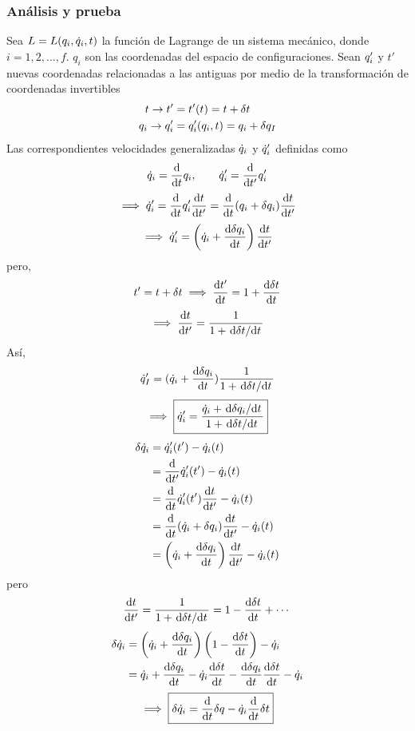 \subsubsection{Análisis y prueba}
Sea $L=L(q_i,\dot{q}_i,t)$ la función de Lagrange de un sistema mecánico, donde $i=1,2,...,f$. $q_i$ son las coordenadas del espacio de configuraciones. Sean $q'_i$ y $t'$ nuevas coordenadas relacionadas a las antiguas por medio de la transformación de coordenadas invertibles 
\begin{align}
  t\to t'&=t'(t)=t+\delta t\\
  q_i\to q' _i&=q'_i(q_i,t)=q_i+\delta q_I
\end{align}
Las correspondientes velocidades generalizadas $\dot{q}_i$ y $\dot{q}'_i$ definidas como
\begin{equation}
  \dot{q}_i=\dv{t}q_i,\qquad \dot{q}'_i=\dv{t'}q'_i
\end{equation}
\begin{equation}
	\implies  \dot{q}'_i=\dv{t}q'_i\dv{t}{t'}=\dv{t}(q_i+\delta q_i)\dv{t}{t'}
\end{equation}
\begin{equation}
  \implies \dot{q}'_i=\left(\dot{q}_i+\dv{\delta q_i}{t}\right)\dv{t}{t'}
\end{equation}
pero, 
\begin{equation}
  t'=t+\delta t\implies \dv{t'}{t}=1+\dv{\delta t}{t}
\end{equation}
\begin{equation}
  \implies \dv{t}{t'}=\frac{1}{1+\dv*{\delta t}{t}}
\end{equation}
Así,
\begin{equation}
  \dot{q}'_I=(\dot{q}_i+\dv{\delta q_i}{t})\frac{1}{1+\dv*{\delta t}{t}}
\end{equation}
\begin{equation}
  \implies \boxed{\dot{q}'_i=\frac{\dot{q}_i+\dv*{\delta q_i}{t}}{1+\dv*{\delta t}{t}}}
\end{equation}
\begin{align}
  \delta \dot{q}_i&=\dot{q}'_i(t')-\dot{q}_i(t)\\
  &=\dv{t'}\dot{q}'_i(t')-\dot{q}_i(t)\\
  &=\dv{t}\dot{q}'_i(t')\dv{t}{t'}-\dot{q}_i(t)\\
  &=\dv{t}(\dot{q}_i+\delta q_i)\dv{t}{t'}-\dot{q}_i(t)\\
  &=\left(\dot{q}_i+\dv{\delta q_i}{t}\right)\dv{t}{t'}-\dot{q}_i(t)
\end{align}
pero
\begin{equation}
  \dv{t}{t'}=\frac{1}{1+\dv*{\delta t}{t}}=1-\dv{\delta t}{t}+\cdots 
\end{equation}
\begin{align}
  \delta \dot{q}_i&=\left(\dot{q}_i+\dv{\delta q_i}{t}\right)\left(1-\dv{\delta t}{t}\right)-\dot{q}_i\\
  &=\dot{q}_i+\dv{\delta q_i}{t}-\dot{q}_i\dv{\delta t}{t}-\dv{\delta q_i}{t}\dv{\delta t}{t}-\dot{q}_i
\end{align}
\begin{equation}\label{clase5-4}
  \implies \boxed{\delta \dot{q}_i=\dv{t}\delta q-\dot{q}_i\dv{t}\delta t}
\end{equation}

